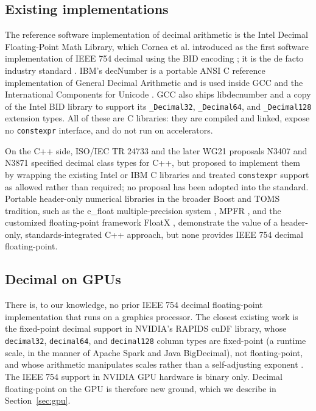 \documentclass[acmsmall]{acmart}
\begin{document}
\subsection{Existing implementations}
The reference software implementation of decimal arithmetic is the Intel Decimal
Floating-Point Math Library, which Cornea et al. introduced as the first software
implementation of IEEE 754 decimal using the BID encoding \cite{cornea2009}; it is
the de facto industry standard \cite{intel-dfp}. IBM's decNumber is a portable ANSI C
reference implementation of General Decimal Arithmetic and is used inside GCC and the
International Components for Unicode \cite{ibm-decnumber}. GCC also ships libdecnumber
and a copy of the Intel BID library to support its \texttt{\_Decimal32},
\texttt{\_Decimal64}, and \texttt{\_Decimal128} extension types. All of these are C
libraries: they are compiled and linked, expose no \texttt{constexpr} interface, and
do not run on accelerators.

On the C++ side, ISO/IEC TR 24733 \cite{tr24733} and the later WG21 proposals N3407
and N3871 \cite{wg21-n3407, wg21-n3871} specified decimal class types for C++, but
proposed to implement them by wrapping the existing Intel or IBM C libraries and
treated \texttt{constexpr} support as allowed rather than required; no proposal has
been adopted into the standard. Portable header-only numerical libraries in the
broader Boost and TOMS tradition, such as the e\_float multiple-precision system
\cite{algorithm910}, MPFR \cite{mpfr}, and the customized floating-point framework
FloatX \cite{floatx}, demonstrate the value of a header-only, standards-integrated
C++ approach, but none provides IEEE 754 decimal floating-point.

\subsection{Decimal on GPUs}
There is, to our knowledge, no prior IEEE 754 decimal floating-point implementation
that runs on a graphics processor. The closest existing work is the fixed-point
decimal support in NVIDIA's RAPIDS cuDF library, whose \texttt{decimal32},
\texttt{decimal64}, and \texttt{decimal128} column types are fixed-point (a runtime
scale, in the manner of Apache Spark and Java BigDecimal), not floating-point, and
whose arithmetic manipulates scales rather than a self-adjusting exponent
\cite{nvidia-cudf}. The IEEE 754 support in NVIDIA GPU hardware is binary only.
Decimal floating-point on the GPU is therefore new ground, which we describe in
Section~\ref{sec:gpu}.
\end{document}
